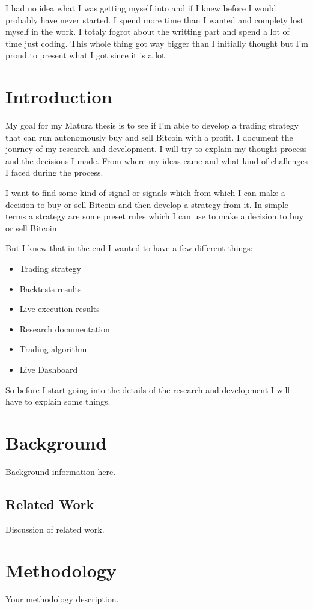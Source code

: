 \documentclass[12pt]{article}
\begin{document}
I had no idea what I was getting myself into and if I knew before I would probably have never started. I spend more time than I wanted and complety lost myself in the work. I totaly fogrot about the writting part and spend a lot of time just coding. This whole thing got way bigger than I initially thought but I'm proud to present what I got since it is a lot.





\newpage
\section{Introduction}
My goal for my Matura thesis is to see if I'm able to develop a trading strategy that can run autonomously buy and sell Bitcoin with a profit. 
I document the journey of my research and development. I will try to explain my thought process and the decisions I made. From where my ideas came and what kind of challenges I faced during the process.

I want to find some kind of signal or signals which from which I can make a decision to buy or sell Bitcoin and then develop a strategy from it. In simple terms a strategy are some preset rules which I can use to make a decision to buy or sell Bitcoin.

But I knew that in the end I wanted to have a few different things:

\begin{itemize}
    \item Trading strategy
    \item Backtests results
    \item Live execution results
    \item Research documentation
    \item Trading algorithm
    \item Live Dashboard

\end{itemize}

So before I start going into the details of the research and development I will have to explain some things.













\newpage

\section{Background}
Background information here.



\newpage
\subsection{Related Work}
Discussion of related work.


\newpage
\section{Methodology}
Your methodology description.



\newpage
\end{document}
